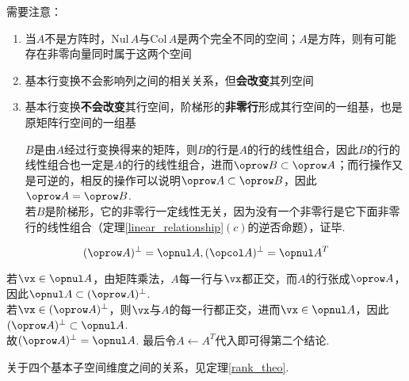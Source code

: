 需要注意：
\begin{enumerate}
	\item 当$A$不是方阵时，$\mathrm{Nul}\, A$与$\mathrm{Col}\, A$是两个完全不同的空间；$A$是方阵，则有可能存在非零向量同时属于这两个空间
	\item 基本行变换不会影响列之间的相关关系，但\textbf{会改变}其列空间
	\item 基本行变换\textbf{不会改变}其行空间，阶梯形的\textbf{非零行}形成其行空间的一组基，也是原矩阵行空间的一组基
\begin{analysis}
$B$是由$A$经过行变换得来的矩阵，则$B$的行是$A$的行的线性组合，因此$B$的行的线性组合也一定是$A$的行的线性组合，进而$\oprow B\subset\oprow A$；而行操作又是可逆的，相反的操作可以说明$\oprow A\subset\oprow B$，因此$\oprow A=\oprow B$.\\
若$B$是阶梯形，它的非零行一定线性无关，因为没有一个非零行是它下面非零行的线性组合（定理\ref{linear_relationship}$(c)$的逆否命题），证毕.
\end{analysis}
\end{enumerate}
\begin{theorem}
\[(\oprow A)^{\perp}=\opnul A,(\opcol A)^{\perp}=\opnul A^T\]
\end{theorem}
\begin{analysis}
若$\vx\in\opnul A$，由矩阵乘法，$A$每一行与$\vx$都正交，而$A$的行张成$\oprow A$，因此$\opnul A\subset(\oprow A)^{\perp}$.\\
若$\vx\in(\oprow A)^\perp$，则$\vx$与$A$的每一行都正交，进而$\vx\in\opnul A$，因此$(\oprow A)^{\perp}\subset\opnul A$.\\
故$(\oprow A)^{\perp}=\opnul A$. 最后令$A\gets A^T$代入即可得第二个结论.
\end{analysis}
\par 关于四个基本子空间维度之间的关系，见定理\ref{rank_theo}.

